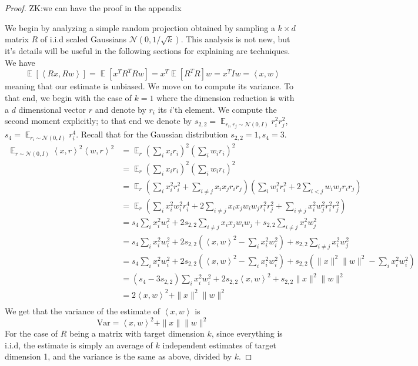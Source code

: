\documentclass{article}
\theoremstyle{definition}
\theoremstyle{plain}
\newcommand{\Var}{\text{Var}}
\DeclareMathOperator{\E}{\mathbb{E}}
\newcommand{\ip}[1]{\left \langle #1 \right \rangle}
\newcommand{\zk}[1]{{\color{blue}ZK:#1}}
\begin{document}
\begin{proof}
\zk{we can have the proof in the appendix}


We begin by analyzing a simple random projection obtained by sampling a $k \times d$ matrix $R$ of i.i.d scaled Gaussians $\mathcal{N}(0, 1/\sqrt{k})$. This analysis is not new, but it's details will be useful in the following sections for explaining are techniques. We have
$$\E[\ip{Rx, Rw}] = \E[x^TR^TRw] = x^T\E[R^TR]w = x^TIw = \ip{x,w}$$
meaning that our estimate is unbiased. We move on to compute its variance. To that end, we begin with the case of $k=1$ where the dimension reduction is with a $d$ dimensional vector $r$ and denote by $r_i$ its $i$'th element. We compute the second moment explicitly; to that end we denote by $s_{2,2} = \E_{r_i,r_j \sim \mathcal{N}(0,I)} r_i^2 r_j^2$, $s_{4} = \E_{r_i \sim \mathcal{N}(0,I)} r_i^4$. Recall that for the Gaussian distribution $s_{2,2}=1, s_{4}=3$.
\begin{align*}
    \E_{r \sim \mathcal{N}(0,I)} \ip{x, r}^2 \ip{w, r}^2 &= \E_r \left( \sum_i x_i r_i \right)^2 \left( \sum_i w_i r_i \right)^2\\
 &= \E_{r} \left(\sum_i x_i r_i\right)^2 \left(\sum_i w_i r_i\right)^2 \\
&=\E_r \left(\sum_i x_i^2 r_i^2 +  \sum_{i \neq j} x_i x_j r_i r_j \right) \left(\sum_i w_i^2 r_i^2 + 2 \sum_{i < j} w_i w_j r_i r_j \right)\\
&= \E_r \left(\sum_i x_i^2 w_i^2 r_i^4 + 2 \sum_{i \neq j} x_i x_j w_i w_j r_i^2 r_j^2 + \sum_{i \neq j} x_i^2 w_j^2 r_i^2 r_j^2\right) \\
&= s_4 \sum_i x_i^2 w_i^2  + 2 s_{2,2} \sum_{i \neq j} x_i x_j w_i w_j  + s_{2,2} \sum_{i \neq j} x_i^2 w_j^2 \\
&= s_4 \sum_i x_i^2 w_i^2  + 2 s_{2,2}\left(\ip{x,w}^2 - \sum_i x_i^2 w_i^2\right) + s_{2,2} \sum_{i \neq j} x_i^2 w_j^2 \\
&= s_4 \sum_i x_i^2 w_i^2  + 2 s_{2,2}\left(\ip{x,w}^2 - \sum_i x_i^2 w_i^2\right) + s_{2,2} \left( \|x\|^2\|w\|^2 - \sum_i x_i^2 w_i^2 \right)  \\
&= \left(s_4 - 3s_{2,2}\right)  \sum_i x_i^2 w_i^2 + 2s_{2,2} \ip{x, w}^2 + s_{2,2} \|x\|^2 \|w\|^2 \\
&= 2\ip{x, w}^2 + \|x\|^2 \|w\|^2 \\
\end{align*}
We get that the variance of the estimate of $\ip{x,w}$ is
$$\Var = \ip{x,w}^2 + \|x\|\|w\|^2$$
For the case of $R$ being a matrix with target dimension $k$, since everything is i.i.d, the estimate is simply an average of $k$ independent estimates of target dimension 1, and the variance is the same as above, divided by $k$.
\end{proof}
\end{document}
